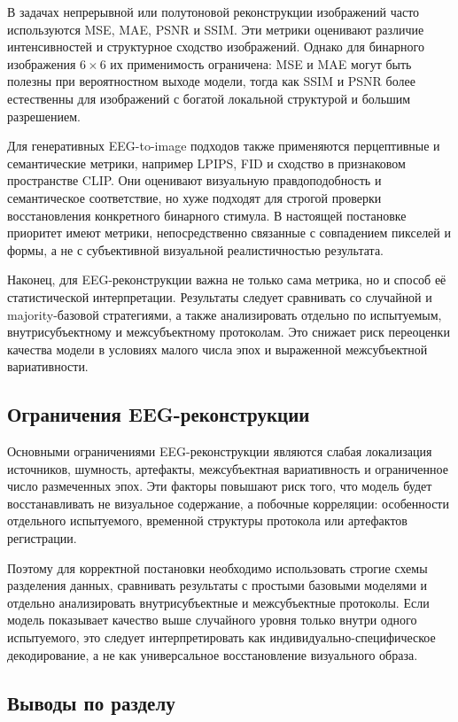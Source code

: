 В задачах непрерывной или полутоновой реконструкции изображений часто используются MSE, MAE, PSNR и SSIM. Эти метрики оценивают различие интенсивностей и структурное сходство изображений. Однако для бинарного изображения $6 \times 6$ их применимость ограничена: MSE и MAE могут быть полезны при вероятностном выходе модели, тогда как SSIM и PSNR более естественны для изображений с богатой локальной структурой и большим разрешением.

Для генеративных EEG-to-image подходов также применяются перцептивные и семантические метрики, например LPIPS, FID и сходство в признаковом пространстве CLIP. Они оценивают визуальную правдоподобность и семантическое соответствие, но хуже подходят для строгой проверки восстановления конкретного бинарного стимула. В настоящей постановке приоритет имеют метрики, непосредственно связанные с совпадением пикселей и формы, а не с субъективной визуальной реалистичностью результата.

Наконец, для EEG-реконструкции важна не только сама метрика, но и способ её статистической интерпретации. Результаты следует сравнивать со случайной и majority-базовой стратегиями, а также анализировать отдельно по испытуемым, внутрисубъектному и межсубъектному протоколам. Это снижает риск переоценки качества модели в условиях малого числа эпох и выраженной межсубъектной вариативности.

\subsection{Ограничения EEG-реконструкции}

Основными ограничениями EEG-реконструкции являются слабая локализация источников, шумность, артефакты, межсубъектная вариативность и ограниченное число размеченных эпох. Эти факторы повышают риск того, что модель будет восстанавливать не визуальное содержание, а побочные корреляции: особенности отдельного испытуемого, временной структуры протокола или артефактов регистрации.

Поэтому для корректной постановки необходимо использовать строгие схемы разделения данных, сравнивать результаты с простыми базовыми моделями и отдельно анализировать внутрисубъектные и межсубъектные протоколы. Если модель показывает качество выше случайного уровня только внутри одного испытуемого, это следует интерпретировать как индивидуально-специфическое декодирование, а не как универсальное восстановление визуального образа.

\subsection*{Выводы по разделу}

